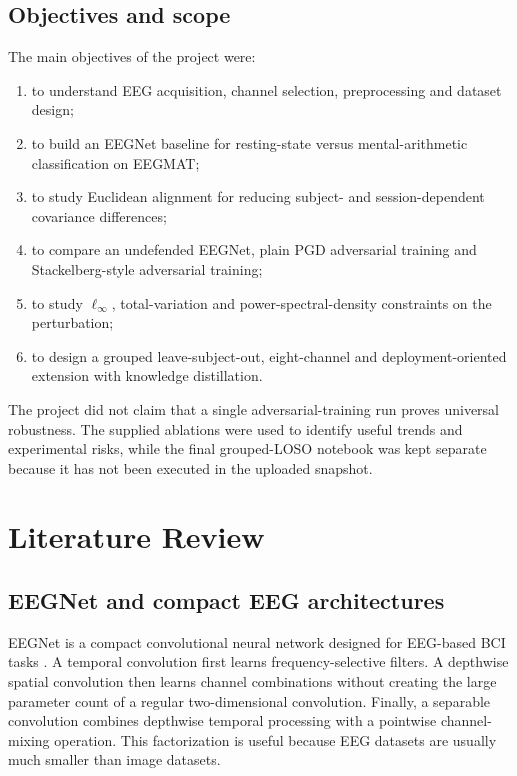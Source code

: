 \documentclass[10pt,a4paper,openright]{report}
\begin{document}
\section{Objectives and scope}
The main objectives of the project were:
\begin{enumerate}
\item to understand EEG acquisition, channel selection, preprocessing and dataset design;
\item to build an EEGNet baseline for resting-state versus mental-arithmetic classification on EEGMAT;
\item to study Euclidean alignment for reducing subject- and session-dependent covariance differences;
\item to compare an undefended EEGNet, plain PGD adversarial training and Stackelberg-style adversarial training;
\item to study $\ell_\infty$, total-variation and power-spectral-density constraints on the perturbation;
\item to design a grouped leave-subject-out, eight-channel and deployment-oriented extension with knowledge distillation.
\end{enumerate}

The project did not claim that a single adversarial-training run proves universal robustness. The supplied ablations were used to identify useful trends and experimental risks, while the final grouped-LOSO notebook was kept separate because it has not been executed in the uploaded snapshot.

\chapter{Literature Review}

\section{EEGNet and compact EEG architectures}
EEGNet is a compact convolutional neural network designed for EEG-based BCI tasks \cite{lawhern}. A temporal convolution first learns frequency-selective filters. A depthwise spatial convolution then learns channel combinations without creating the large parameter count of a regular two-dimensional convolution. Finally, a separable convolution combines depthwise temporal processing with a pointwise channel-mixing operation. This factorization is useful because EEG datasets are usually much smaller than image datasets.
\end{document}
